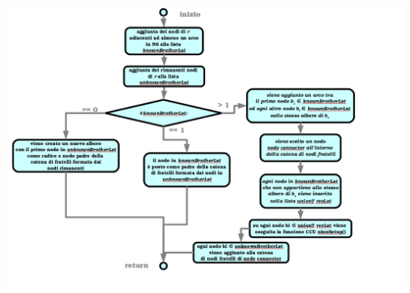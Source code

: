 \documentclass[a4paper,11pt]{report}
\begin{document}
\paragraph{}
\centerline{\includegraphics[width=150mm]{images/flusso_reduce.png}} 
\end{document}

